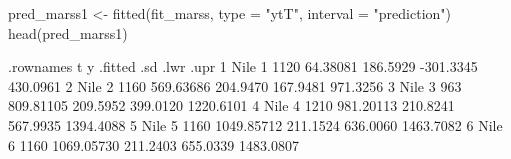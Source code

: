 \begin{Schunk}
\begin{Sinput}
 pred_marss1 <- fitted(fit_marss, type = "ytT", interval = "prediction")
 head(pred_marss1)
\end{Sinput}
\begin{Soutput}
  .rownames t    y    .fitted      .sd      .lwr      .upr
1      Nile 1 1120   64.38081 186.5929 -301.3345  430.0961
2      Nile 2 1160  569.63686 204.9470  167.9481  971.3256
3      Nile 3  963  809.81105 209.5952  399.0120 1220.6101
4      Nile 4 1210  981.20113 210.8241  567.9935 1394.4088
5      Nile 5 1160 1049.85712 211.1524  636.0060 1463.7082
6      Nile 6 1160 1069.05730 211.2403  655.0339 1483.0807
\end{Soutput}
\end{Schunk}
